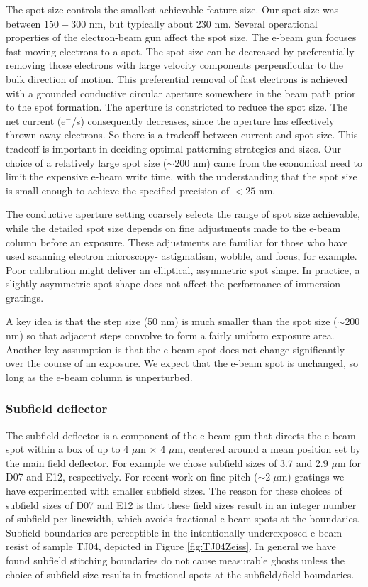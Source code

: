 \documentclass[]{spie}  %
\begin{document}
The spot size controls the smallest achievable feature size.  Our spot size was between $150-300$ nm, but typically about 230 nm.  Several operational properties of the electron-beam gun affect the spot size.  The e-beam gun focuses fast-moving electrons to a spot.  The spot size can be decreased by preferentially removing those electrons with large velocity components perpendicular to the bulk direction of motion.  This preferential removal of fast electrons is achieved with a grounded conductive circular aperture somewhere in the beam path prior to the spot formation.  The aperture is constricted to reduce the spot size.  The net current (e$^-$/s) consequently decreases, since the aperture has effectively thrown away electrons.  So there is a tradeoff between current and spot size.  This tradeoff is important in deciding optimal patterning strategies and sizes.  Our choice of a relatively large spot size ($\sim 200$ nm) came from the economical need to limit the expensive e-beam write time, with the understanding that the spot size is small enough to achieve the specified precision of $< 25$ nm.

The conductive aperture setting coarsely selects the range of spot size achievable, while the detailed spot size depends on fine adjustments made to the e-beam column before an exposure.  These adjustments are familiar for those who have used scanning electron microscopy- astigmatism, wobble, and focus, for example.  Poor calibration might deliver an elliptical, asymmetric spot shape.  In practice, a slightly asymmetric spot shape does not affect the performance of immersion gratings.

A key idea is that the step size (50 nm) is much smaller than the spot size ($\sim200$ nm) so that adjacent steps convolve to form a fairly uniform exposure area.  Another key assumption is that the e-beam spot does not change significantly over the course of an exposure.  We expect that the e-beam spot is unchanged, so long as the e-beam column is unperturbed.

\subsubsection{Subfield deflector}
The subfield deflector is a component of the e-beam gun that directs the e-beam spot within a box of up to 4 $\mu$m $\times$ 4 $\mu$m, centered around a mean position set by the main field deflector.  For example we chose subfield sizes of 3.7 and 2.9 $\mu$m for D07 and E12, respectively.  For recent work on fine pitch ($\sim2\; \mu$m) gratings we have experimented with smaller subfield sizes.  The reason for these choices of subfield sizes of D07 and E12 is that these field sizes result in an integer number of subfield per linewidth, which avoids fractional e-beam spots at the boundaries.  Subfield boundaries are perceptible in the intentionally underexposed e-beam resist of sample TJ04, depicted in Figure \ref{fig:TJ04Zeiss}.  In general we have found subfield stitching boundaries do not cause measurable ghosts unless the choice of subfield size results in fractional spots at the subfield/field boundaries.  
\end{document}
